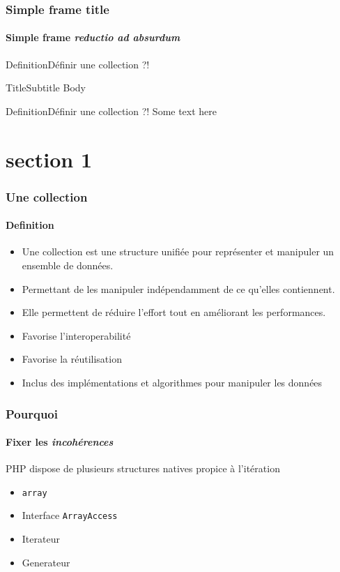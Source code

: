 





\begin{frame}[plain]
	\titlepage{}
\end{frame}

\begin{frame}[allowframebreaks]
	\frametitle{Simple frame title}
	\framesubtitle{Simple frame \textit{reductio ad absurdum}}
\end{frame}


\begin{sepframe}{Definition}{Définir une collection ?!}

\end{sepframe}

\begin{frameA}{Title}{Subtitle}
Body
\end{frameA}

\begin{frameB}{Definition}{Définir une collection ?!}
Some text here
\end{frameB}

\section{section 1}
\begin{frame}
	\frametitle{Une collection}
    \framesubtitle{Definition}

    \begin{itemize}
        \item Une collection est une structure unifiée pour représenter et manipuler un ensemble de données.
        \item Permettant de les manipuler indépendamment de ce qu'elles contiennent.
        \item Elle permettent de réduire l'effort tout en améliorant les performances\footnotemark.
        \item Favorise l'interoperabilité
        \item Favorise la réutilisation
        \item Inclus des implémentations et algorithmes pour manipuler les données
    \end{itemize}

\end{frame}

\begin{frame}
	\frametitle{Pourquoi}
    \framesubtitle{Fixer les \textit{incohérences}}

    PHP dispose de plusieurs structures natives propice à l'itération

    \begin{itemize}[<+->]
        \item \texttt{array}
        \item Interface \texttt{ArrayAccess}
        \item Iterateur
        \item Generateur
    \end{itemize}
\end{frame}

